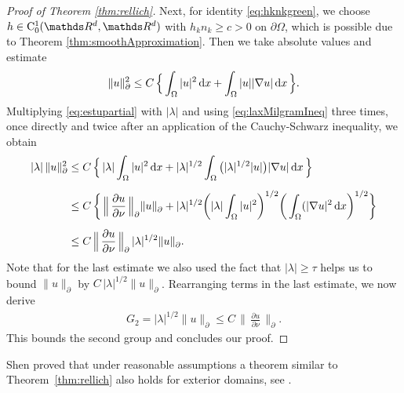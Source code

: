 \begin{proof}[Proof of Theorem \ref{thm:rellich}]
  Next, for identity \eqref{eq:hknkgreen}, we choose $h \in \CC_0^1(\R^d, \R^d)$ with $h_k n_k \geq c > 0$ on $\partial\Omega$, which is possible due to Theorem \ref{thm:smoothApproximation}.
  Then we take absolute values and estimate
  \begin{align}
    \label{eq:estupartial}
    \|u\|_\partial^2 \leq C\, \Big\{ \int_\Omega |u|^2 \, {\operatorname{d}\!{x}} +  \int_\Omega |u| |\nabla u| \, {\operatorname{d}\!{x}}\, \Big\}.
  \end{align}
  Multiplying  \eqref{eq:estupartial} with $|\lambda|$ and using \eqref{eq:laxMilgramIneq} three times, once directly and twice after an application of the Cauchy-Schwarz inequality, we obtain 
  \begin{align*}
    |\lambda|\, \|u\|_\partial^2 
    &\leq C\, \Big\{\, |\lambda| \int_\Omega |u|^2 \, {\operatorname{d}\!{x}} + |\lambda|^{1/2}  \int_\Omega \big(|\lambda|^{1/2} |u| \big) |\nabla u| \, {\operatorname{d}\!{x}}\, \Big\} \nonumber\\[0.5em]
    &\leq C\, \bigg\{ \, \Big\|\, \frac{\partial u}{\partial \nu} \, \Big\|^{}_\partial \|u\|^{}_\partial + |\lambda|^{1/2} \bigg( |\lambda|\int_\Omega  |u|^2 \bigg)^{1/2} \bigg( \int_\Omega (|\nabla u|^2 \, {\operatorname{d}\!{x}} \bigg)^{1/2} \bigg\} \\[0.5em]
    &\leq C\, \Big\|\,\frac{\partial u}{\partial \nu} \, \Big\|^{}_\partial \, |\lambda|^{1/2}  \|u\|^{}_\partial.
  \end{align*}
  Note that for the last estimate we also used the fact that $|\lambda| \geq \tau$ helps us to bound $\|u\|^{}_\partial$ by $C\, |\lambda|^{1/2} \|u\|^{}_\partial$.
  Rearranging terms in the last estimate, we now derive
  \begin{align}
    \label{eq:lambda12u}
    G_2
    = |\lambda|^{1/2} \|  u\|^{}_\partial 
    \leq C\, \Big\|\, \frac{\partial u}{\partial \nu} \,\Big\|^{}_\partial.
  \end{align}
  This bounds the second group and concludes our proof.
\end{proof}

Shen proved that under reasonable assumptions a theorem similar to Theorem~\ref{thm:rellich} also holds for exterior domains, see \cite[Thm.\@~4.6]{Shen2012}.

